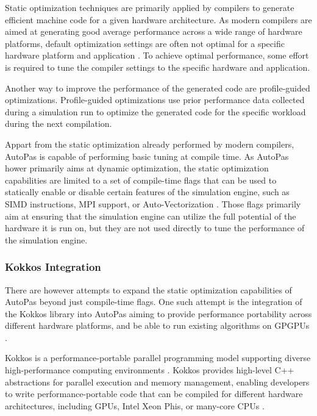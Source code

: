 \documentclass[conference]{IEEEtran}
\begin{document}
Static optimization techniques are primarily applied by compilers to generate efficient machine code for a given hardware architecture. As modern compilers are aimed at generating good average performance across a wide range of hardware platforms, default optimization settings are often not optimal for a specific hardware platform and application \cite{fursin2014collectivetuninginitiative}. To achieve optimal performance, some effort is required to tune the compiler settings to the specific hardware and application.

Another way to improve the performance of the generated code are profile-guided optimizations. Profile-guided optimizations use prior performance data collected during a simulation run to optimize the generated code for the specific workload during the next compilation.

Appart from the static optimization already performed by modern compilers, AutoPas is capable of performing basic tuning at compile time. As AutoPas hower primarily aims at dynamic optimization, the static optimization capabilities are limited to a set of compile-time flags that can be used to statically enable or disable certain features of the simulation engine, such as SIMD instructions, MPI support, or Auto-Vectorization \cite{Gratl2019AutoPas}. Those flags primarily aim at ensuring that the simulation engine can utilize the full potential of the hardware it is run on, but they are not used directly to tune the performance of the simulation engine.

\subsubsection{Kokkos Integration}

There are however attempts to expand the static optimization capabilities of AutoPas beyond just compile-time flags. One such attempt is the integration of the Kokkos library into AutoPas aiming to provide performance portability across different hardware platforms, and be able to run existing algorithms on GPGPUs \cite{Gärtner_KokkosInAutoPas.pdf}.

Kokkos is a performance-portable parallel programming model supporting diverse high-performance computing environments \cite{CARTEREDWARDS20143202}. Kokkos provides high-level C++ abstractions for parallel execution and memory management, enabling developers to write performance-portable code that can be compiled for different hardware architectures, including GPUs, Intel Xeon Phis, or many-core CPUs \cite{lammps_kokkos}.
\end{document}
